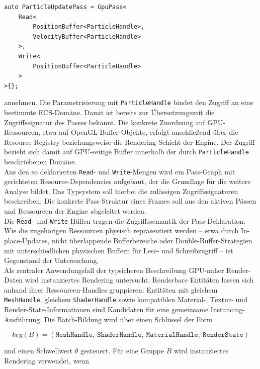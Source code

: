 \begin{verbatim}
auto ParticleUpdatePass = GpuPass<
    Read<
        PositionBuffer<ParticleHandle>,
        VelocityBuffer<ParticleHandle>
    >,
    Write<
        PositionBuffer<ParticleHandle>
    >
>{};
\end{verbatim}

\noindent
annehmen.
Die Parametrisierung mit \texttt{ParticleHandle} bindet den Zugriff an eine bestimmte ECS-Domäne.
Damit ist bereits zur Übersetzungszeit die Zugriffssignatur des Passes bekannt.
Die konkrete Zuordnung auf GPU-Ressourcen, etwa auf OpenGL-Buffer-Objekte, erfolgt anschließend über die Resource-Registry beziehungsweise die Rendering-Schicht der Engine.
Der Zugriff bezieht sich damit auf GPU-seitige Buffer innerhalb der durch \texttt{ParticleHandle} beschriebenen Domäne.\\

Aus den so deklarierten \texttt{Read}- und \texttt{Write}-Mengen wird ein Pass-Graph mit gerichteten Resource-Dependencies aufgebaut, der die Grundlage für die weitere Analyse bildet.
Das Typsystem soll hierbei die zulässigen Zugriffssignaturen beschreiben.
Die konkrete Pass-Struktur eines Frames soll  aus den aktiven Pässen und Ressourcen der Engine abgeleitet werden.\\

Die \texttt{Read}- und \texttt{Write}-Hüllen tragen die Zugriffssemantik der Pass-Deklaration.
Wie die zugehörigen Ressourcen physisch repräsentiert werden -- etwa durch In-place-Updates, nicht überlappende Bufferbereiche oder Double-Buffer-Strategien mit unterschiedlichen physischen Buffern für Lese- und Schreibzugriff -- ist Gegenstand der Untersuchung.\\

Als zentraler Anwendungsfall der typsicheren Beschreibung GPU-naher Render-Daten wird instanziertes Rendering untersucht.
Renderbare Entitäten lassen sich anhand ihrer Ressourcen-Handles gruppieren:
Entitäten mit gleichem \texttt{MeshHandle}, gleichem \texttt{ShaderHandle} sowie kompatiblen Material-, Textur- und Render-State-Informationen sind Kandidaten für eine gemeinsame Instancing-Ausführung.
Die Batch-Bildung wird über einen Schlüssel der Form

\[
    key(B) =
    (\texttt{MeshHandle},\ \texttt{ShaderHandle},\ \texttt{MaterialHandle},\ \texttt{RenderState})
\]

\noindent
und einen Schwellwert \(\theta\) gesteuert.
Für eine Gruppe \(B\) wird instanziertes Rendering verwendet, wenn

